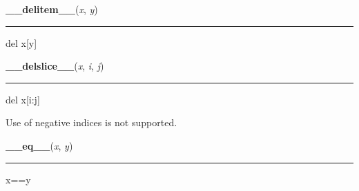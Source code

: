     \label{pygame:Rect:__delitem__}

    \vspace{0.5ex}

\hspace{.8\funcindent}\begin{boxedminipage}{\funcwidth}

    \raggedright \textbf{\_\_delitem\_\_}(\textit{x}, \textit{y})

    \vspace{-1.5ex}

    \rule{\textwidth}{0.5\fboxrule}
\setlength{\parskip}{2ex}
    del x[y]

\setlength{\parskip}{1ex}
    \end{boxedminipage}

    \label{pygame:Rect:__delslice__}

    \vspace{0.5ex}

\hspace{.8\funcindent}\begin{boxedminipage}{\funcwidth}

    \raggedright \textbf{\_\_delslice\_\_}(\textit{x}, \textit{i}, \textit{j})

    \vspace{-1.5ex}

    \rule{\textwidth}{0.5\fboxrule}
\setlength{\parskip}{2ex}
    del x[i:j]

    Use of negative indices is not supported.

\setlength{\parskip}{1ex}
    \end{boxedminipage}

    \label{pygame:Rect:__eq__}

    \vspace{0.5ex}

\hspace{.8\funcindent}\begin{boxedminipage}{\funcwidth}

    \raggedright \textbf{\_\_eq\_\_}(\textit{x}, \textit{y})

    \vspace{-1.5ex}

    \rule{\textwidth}{0.5\fboxrule}
\setlength{\parskip}{2ex}
    x==y

\setlength{\parskip}{1ex}
    \end{boxedminipage}

